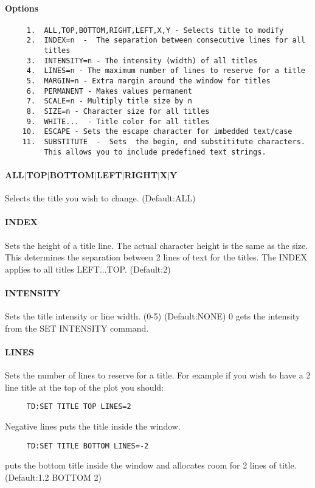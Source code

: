 \paragraph{Options}
\begin{verbatim}
     1.  ALL,TOP,BOTTOM,RIGHT,LEFT,X,Y - Selects title to modify 
     2.  INDEX=n  -  The separation between consecutive lines for all
         titles 
     3.  INTENSITY=n - The intensity (width) of all titles 
     4.  LINES=n - The maximum number of lines to reserve for a title 
     5.  MARGIN=n - Extra margin around the window for titles 
     6.  PERMANENT - Makes values permanent 
     7.  SCALE=n - Multiply title size by n 
     8.  SIZE=n - Character size for all titles 
     9.  WHITE...  - Title color for all titles 
    10.  ESCAPE - Sets the escape character for imbedded text/case 
    11.  SUBSTITUTE  -  Sets  the begin, end substititute characters.
         This allows you to include predefined text strings.  
\end{verbatim}
\paragraph{ALL$|$TOP$|$BOTTOM$|$LEFT$|$RIGHT$|$X$|$Y}
Selects the title you wish to change.  (Default:ALL) 
\paragraph{INDEX}
Sets  the height of a title line.  The actual character height is the
same as the size.  This determines the separation between 2 lines  of
text  for  the  titles.   The INDEX applies to all titles LEFT...TOP.
(Default:2) 
\paragraph{INTENSITY}
Sets  the title intensity or line width.  (0-5) (Default:NONE) 0 gets
the intensity from the SET INTENSITY command.  
\paragraph{LINES}
Sets  the number of lines to reserve for a title.  For example if you
wish to have a 2 line title at the top of the plot you should:  
\begin{verbatim}
     TD:SET TITLE TOP LINES=2 
\end{verbatim}

Negative lines puts the title inside the window.  
\begin{verbatim}
     TD:SET TITLE BOTTOM LINES=-2 
\end{verbatim}
puts  the  bottom  title  inside  the window and allocates room for 2
lines of title.  (Default:1.2 BOTTOM 2) 
